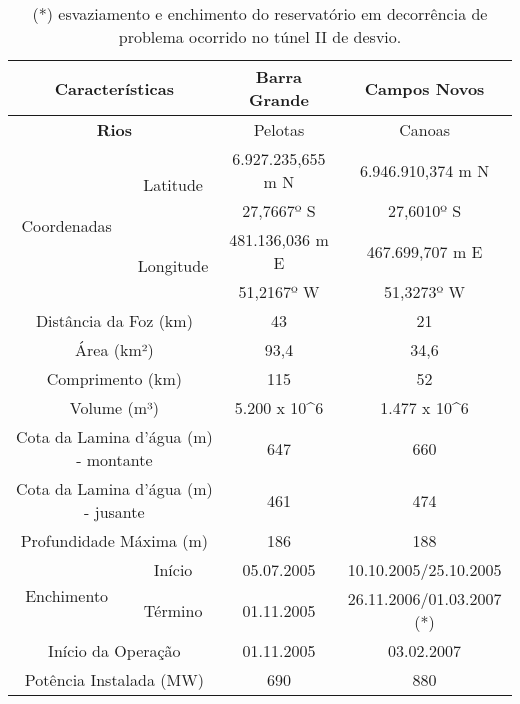 \begin{table}[hb]
\centering
\begin{tabular}{|c|c|c|c|}
\hline
\multicolumn{2}{|c|}{\textbf{Características}} & \textbf{Barra Grande} & \textbf{Campos Novos} \\
\hline
\multicolumn{2}{|c|}{\textbf{Rios}} & Pelotas & Canoas \\
\hline
    \multirow{4}{*}{Coordenadas}
        & \multirow{2}{*}{Latitude}
            & 6.927.235,655 m N & 6.946.910,374 m N \\
            \cline{3-4}
            && 27,7667º S & 27,6010º S\\
            \cline{2-4}
        & \multirow{2}{*}{Longitude}
            & 481.136,036 m E & 467.699,707 m E \\
            \cline{3-4}
            && 51,2167º W & 51,3273º W \\
\hline
\multicolumn{2}{|c|}{Distância da Foz (km)} & 43 &  21 \\ \hline
\multicolumn{2}{|c|}{Área (km²)} & 93,4 &  34,6 \\ \hline
\multicolumn{2}{|c|}{Comprimento (km)} & 115 &  52 \\ \hline
\multicolumn{2}{|c|}{Volume (m³)} & 5.200 x 10^6 &  1.477 x 10^6 \\ \hline
\multicolumn{2}{|c|}{Cota da Lamina d'água (m) - montante} & 647 &  660 \\ \hline
\multicolumn{2}{|c|}{Cota da Lamina d'água (m) - jusante} & 461 &  474 \\ \hline
\multicolumn{2}{|c|}{Profundidade Máxima (m)} & 186 &  188 \\ \hline
    \multirow{2}{*}{Enchimento}
        & Início & 05.07.2005 & 10.10.2005/25.10.2005 \\
        \cline{2-4}
        & Término & 01.11.2005 & 26.11.2006/01.03.2007 (*) \\
        \hline
\multicolumn{2}{|c|}{Início da Operação} & 01.11.2005 & 03.02.2007 \\ \hline
\multicolumn{2}{|c|}{Potência Instalada (MW)} &  690 & 880 \\ \hline
\end{tabular}
\caption{(*) esvaziamento e enchimento do reservatório em decorrência de problema ocorrido no túnel II de desvio.}
\end{table}

